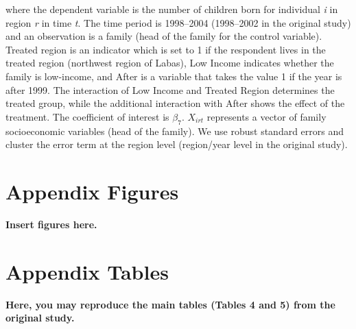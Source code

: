 \documentclass[12pt,a4paper]{article}
\begin{document}
where the dependent variable is the number of children born for individual \textit{i} in region \textit{r} in time \textit{t}. The time period is 1998--2004 (1998--2002 in the original study) and an observation is a family (head of the family for the control variable). Treated region is an indicator which is set to 1 if the respondent lives in the treated region (northwest region of Labas), Low Income indicates whether the family is low-income, and After is a variable that takes the value 1 if the year is after 1999.  The interaction of Low Income and Treated Region determines the treated group, while the additional interaction with After shows the effect of the treatment. The coefficient of interest is $\beta_{7}$. $X_{irt}$ represents a vector of family socioeconomic variables (head of the family). We use robust standard errors and cluster the error term at the region level (region/year level in the original study).


\clearpage 

\renewcommand{\thefigure}{A\arabic{figure}}
\renewcommand{\thetable}{A\arabic{table}}
\setcounter{figure}{0}
\setcounter{table}{0}

\section{Appendix Figures}

\textbf{Insert figures here.}

\clearpage

\section{Appendix Tables}

\textbf{Here, you may reproduce the main tables (Tables 4 and 5) from the original study.}
\end{document}
